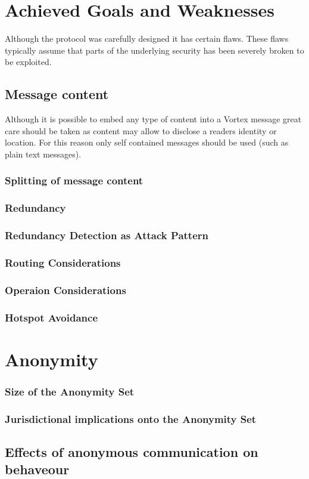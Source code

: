 \chapter{Achieved Goals and Weaknesses}
Although the protocol was carefully designed it has certain flaws. These flaws typically assume that parts of the underlying security has been severely broken to be exploited.


\section{Message content}
Although it is possible to embed any type of content into a Vortex message great care should be taken as content may allow to disclose a readers identity or location. For this reason only self contained messages should be used (such as plain text messages).

\subsection{Splitting of message content}

\subsection{Redundancy}

\subsection{Redundancy Detection as Attack Pattern}

\subsection{Routing Considerations}

\subsection{Operaion Considerations}

\subsection{Hotspot Avoidance}


\chapter{Anonymity}

\subsection{Size of the Anonymity Set}

\subsection{Jurisdictional implications onto the Anonymity Set}

\section{Effects of anonymous communication on behaveour}


